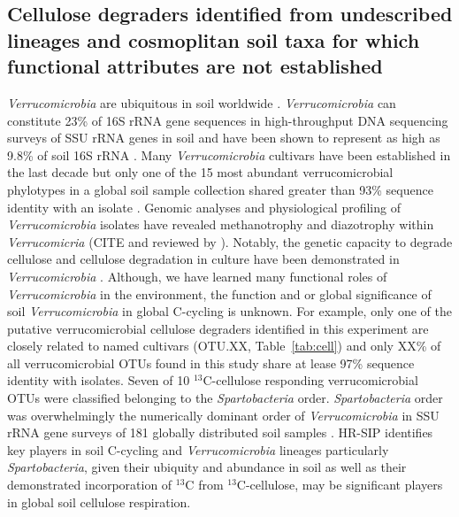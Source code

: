 \subsection{Cellulose degraders identified from undescribed lineages and
    cosmoplitan soil taxa for which functional attributes are not established}
\textit{Verrucomicrobia} are ubiquitous in soil worldwide
\citep{Bergmann_2011}.  \textit{Verrucomicrobia} can constitute 23\% of 16S
rRNA gene sequences in high-throughput DNA sequencing surveys of SSU rRNA genes
in soil \citep{Bergmann_2011} and have been shown to represent as high as 9.8\%
of soil 16S rRNA \citep{Buckley_2001}. Many \textit{Verrucomicrobia} cultivars
have been established in the last decade \cite{Wertz_2011} but only one of the
15 most abundant verrucomicrobial phylotypes in a global soil sample collection
shared greater than 93\% sequence identity with an isolate
\citep{Bergmann_2011}.  Genomic analyses and physiological profiling of
\textit{Verrucomicrobia} isolates have revealed methanotrophy and diazotrophy
\citep{Wertz_2011} within \textit{Verrucomicria} (CITE and reviewed by
\citet{Wertz_2011}). Notably, the genetic capacity to degrade cellulose and
cellulose degradation in culture have been demonstrated in
\textit{Verrucomicrobia} \citep{Otsuka_2012, Wertz_2011}.  Although, we have
learned many functional roles of \textit{Verrucomicrobia} in the environment,
the function and or global significance of soil \textit{Verrucomicrobia} in
global C-cycling is unknown. For example, only one of the putative
verrucomicrobial cellulose degraders identified in this experiment are closely
related to named cultivars (OTU.XX, Table~\ref{tab:cell}) and only XX\% of all
verrucomicrobial OTUs found in this study share at lease 97\% sequence identity
with isolates. Seven of 10 $^{13}$C-cellulose responding verrucomicrobial OTUs
were classified belonging to the \textit{Spartobacteria} order.
\textit{Spartobacteria} order was overwhelmingly the numerically dominant order
of \textit{Verrucomicrobia} in SSU rRNA gene surveys of 181 globally
distributed soil samples \citep{Bergmann_2011}. HR-SIP identifies key players
in soil C-cycling and \textit{Verrucomicrobia} lineages particularly
\textit{Spartobacteria}, given their ubiquity and abundance in soil as well as
their demonstrated incorporation of $^{13}$C from $^{13}$C-cellulose, may be
significant players in global soil cellulose respiration. 

